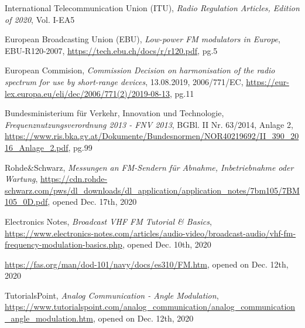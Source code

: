 \documentclass[conference]{IEEEtran}
\begin{document}
%
%
%
\begin{thebibliography}{1}
    International Telecommunication Union (ITU), \emph{Radio Regulation Articles, Edition of 2020}, Vol. I-EA5

    European Broadcasting Union (EBU), \emph{Low-power FM modulators in Europe}, EBU-R120-2007, \url{https://tech.ebu.ch/docs/r/r120.pdf}, pg.5

    European Commision, \emph{Commission Decision on harmonisation of the radio spectrum for use by short-range devices}, 13.08.2019, 2006/771/EC, \url{https://eur-lex.europa.eu/eli/dec/2006/771(2)/2019-08-13}, pg.11

    Bundesministerium für Verkehr, Innovation und Technologie, \emph{Frequenznutzungsverordnung 2013 - FNV 2013}, BGBl. II Nr. 63/2014, Anlage 2, \url{https://www.ris.bka.gv.at/Dokumente/Bundesnormen/NOR40219692/II_390_2016_Anlage_2.pdf}, pg.99

  Rohde\&Schwarz, \emph{Messungen an FM-Sendern für Abnahme, Inbetriebnahme oder Wartung}, \url{https://cdn.rohde-schwarz.com/pws/dl_downloads/dl_application/application_notes/7bm105/7BM105_0D.pdf}, opened Dec. 17th, 2020

    Electronics Notes, \emph{Broadcast VHF FM Tutorial \& Basics}, \url{https://www.electronics-notes.com/articles/audio-video/broadcast-audio/vhf-fm-frequency-modulation-basics.php}, opened Dec. 10th, 2020

    \url{https://fas.org/man/dod-101/navy/docs/es310/FM.htm}, opened on Dec. 12th, 2020

    TutorialsPoint, \emph{Analog Communication - Angle Modulation}, \url{https://www.tutorialspoint.com/analog_communication/analog_communication_angle_modulation.htm}, opened on Dec. 12th, 2020


\end{thebibliography}
\end{document}
